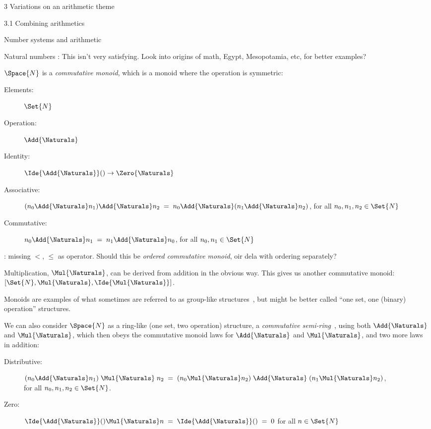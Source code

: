 \documentclass[12pt]{PalisadesLakesBook}
\begin{document}
\begin{plSection}{3 Variations on an arithmetic theme}
\begin{plSection}{3.1 Combining arithmetics}
\begin{plSection}{Number systems and arithmetic}
\begin{plSection}{Natural numbers}
\TODO: This isn't very satisfying.
Look into origins of math, Egypt, Mesopotamia, etc, for better
examples?

$\Space{N}$ is  a \emph{commutative monoid},
which is a monoid where the operation is symmetric:
\begin{description}
\item[Elements:] $\Set{N}$
\item[Operation:] $\Add{\Naturals}$
\item[Identity:] $\Ide{\Add{\Naturals}}() \rightarrow \Zero{\Naturals}$
\item[Associative:] 
$(n_0 \Add{\Naturals} n_1) \Add{\Naturals} n_2 \;=\;
n_0 \Add{\Naturals} (n_1 \Add{\Naturals} n_2)$, 
for all $n_0, n_1, n_2 \in \Set{N}$
\item[Commutative:] $n_0 \Add{\Naturals} n_1 \;=\;
n_1 \Add{\Naturals} n_0$,
for all $n_0, n_1 \in \Set{N}$
\end{description}

\TODO: missing $<$, $\leq$ as operator.
Should this be \emph{ordered commutative monoid},
oir dela with ordering separately?

Multiplication, $\Mul{\Naturals}$, can be derived from addition in the
obvious way.
This gives us another commutative monoid:
$[\Set{N}, \Mul{\Naturals}, \Ide{\Mul{\Naturals}}]$.

Monoids are examples of what sometimes are referred to 
as group-like structures~\cite{wiki:GroupLike},
but might be better called ``one set, one (binary) operation''
structures.

We can also consider $\Space{N}$ as a ring-like
(one set, two operation)
structure, a \emph{commutative semi-ring}~\cite{wiki:Semiring}, 
using both $\Add{\Naturals}$ and $\Mul{\Naturals}$,
which then obeys the commutative monoid laws for
$\Add{\Naturals}$ and $\Mul{\Naturals}$, and two more laws in addition:
\begin{description}
\item[Distributive:] 
$(n_0 \Add{\Naturals} n_1) \; \Mul{\Naturals}\; n_2 \;=\;
(n_0 \Mul{\Naturals} n_2) \; \Add{\Naturals} \; (n_1 \Mul{\Naturals} n_2)$, \\
for all $n_0, n_1, n_2 \in \Set{N}$.
\item[Zero:] $\Ide{\Add{\Naturals}}() \Mul{\Naturals} n \; = \; \Ide{\Add{\Naturals}}() 
\; = \; 0$ for all $n \in \Set{N}$
\end{description}


\end{plSection}
\end{plSection}
\end{plSection}
\end{plSection}
\end{document}
